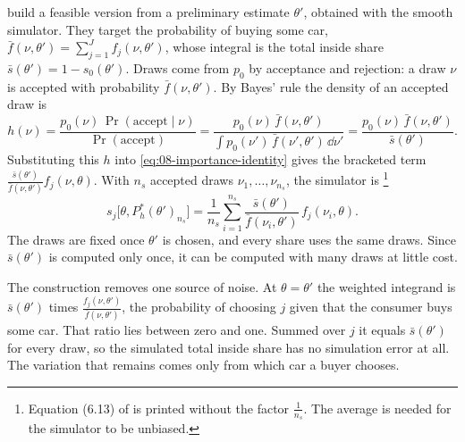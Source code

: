 \citeauthor{BerryLevinsohnPakes1995} build a feasible version from a preliminary estimate $\theta'$, obtained with the
smooth simulator. They target the probability of buying some car, $\bar f(\nu, \theta') = \sum_{j=1}^{J} f_j(\nu,
\theta')$, whose integral is the total inside share $\bar s(\theta') = 1 - s_0(\theta')$. Draws come from $p_0$ by
acceptance and rejection: a draw $\nu$ is accepted with probability $\bar f(\nu, \theta')$. By Bayes' rule the
density of an accepted draw is
\begin{equation}\label{eq:08-accepted-density}
  h(\nu) = \frac{p_0(\nu)\, \Pr(\text{accept} \mid \nu)}{\Pr(\text{accept})}
         = \frac{p_0(\nu)\, \bar f(\nu, \theta')}{\int p_0(\nu')\, \bar f(\nu', \theta')\, \dd\nu'}
         = \frac{p_0(\nu)\, \bar f(\nu, \theta')}{\bar s(\theta')}.
\end{equation}
Substituting this $h$ into \eqref{eq:08-importance-identity} gives the bracketed term $\frac{\bar
s(\theta')}{\bar f(\nu, \theta')}f_j(\nu, \theta)$. With $n_s$ accepted draws $\nu_1, \dots, \nu_{n_s}$, the
simulator is \citep[eq.~(6.13)]{BerryLevinsohnPakes1995}\footnote{Equation (6.13) of
\citet{BerryLevinsohnPakes1995} is printed without the factor $\frac{1}{n_s}$. The average is needed for the
simulator to be unbiased.}
\begin{equation}\label{eq:08-blp-importance}
  s_j\bigl[\theta, P^*_h(\theta')_{n_s}\bigr] = \frac{1}{n_s}\sum_{i=1}^{n_s}
  \frac{\bar s(\theta')}{\bar f(\nu_i, \theta')}\, f_j(\nu_i, \theta).
\end{equation}
The draws are fixed once $\theta'$ is chosen, and every share uses the same draws. Since $\bar s(\theta')$ is computed
only once, it can be computed with many draws at little cost.

The construction removes one source of noise. At $\theta = \theta'$ the weighted integrand is $\bar s(\theta')$ times
$\frac{f_j(\nu, \theta')}{\bar f(\nu, \theta')}$, the probability of choosing $j$ given that the consumer buys some
car. That ratio lies between zero and one. Summed over $j$ it equals $\bar s(\theta')$ for every draw, so the
simulated total inside share has no simulation error at all. The variation that remains comes only from which car
a buyer chooses.

